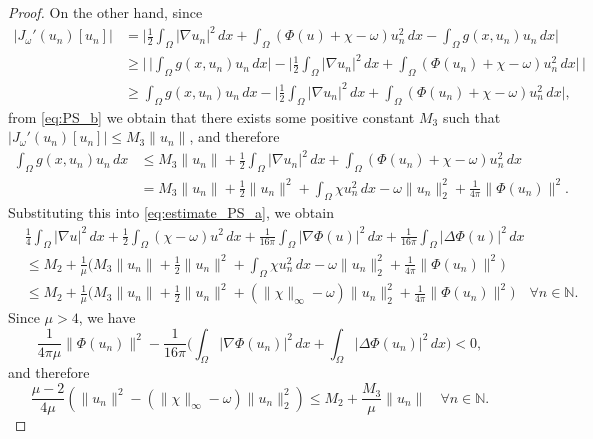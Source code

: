 \documentclass[reqno]{amsart}
\begin{document}
\begin{proof}
On the other hand, since
 \begin{align*}
 |J_\omega'(u_n)[u_n]|
& = \Big|\frac{1}{2} \int_\Omega |\nabla u_n|^2 \,dx 
  + \int_\Omega (\Phi(u) + \chi - \omega) u_n^2 \,dx 
  - \int_\Omega g(x, u_n) u_n \,dx\Big|  \\
& \geq \Big|\, \Big|\int_\Omega g(x, u_n) u_n \,dx\Big| 
  - \Big|\frac{1}{2} \int_\Omega |\nabla u_n|^2 \,dx 
   + \int_\Omega (\Phi(u_n) + \chi - \omega) u_n^2 \,dx\Big|\, \Big|  \\
& \geq \int_\Omega g(x, u_n) u_n \,dx 
 - \Big|\frac{1}{2} \int_\Omega |\nabla u_n|^2 \,dx 
 + \int_\Omega (\Phi(u_n) + \chi - \omega) u_n^2 \,dx\Big|,
\end{align*}
from \eqref{eq:PS_b} we obtain that there exists some positive constant $M_3$ such 
that $|J_\omega'(u_n)[u_n]| \leq M_3 \|u_n\|$, and therefore
\begin{align*}
 \int_\Omega g(x, u_n) u_n \,dx
 & \leq M_3 \|u_n\| + \frac{1}{2} \int_\Omega |\nabla u_n|^2 \,dx 
  + \int_\Omega (\Phi(u_n) + \chi - \omega) u_n^2 \,dx  \\
 & = M_3 \|u_n\| + \frac{1}{2} \|u_n\|^2 + \int_\Omega \chi u_n^2 \,dx 
  - \omega \|u_n\|_2^2 + \frac{1}{4\pi} \|\Phi(u_n)\|^2.
\end{align*}
Substituting this into \eqref{eq:estimate_PS_a}, we obtain
 \begin{align*}
&\frac{1}{4} \int_\Omega |\nabla u|^2 \,dx
  + \frac{1}{2} \int_\Omega (\chi - \omega) u^2 \,dx 
  + \frac{1}{16 \pi} \int_\Omega |\nabla \Phi(u)|^2 \,dx 
  + \frac{1}{16 \pi} \int_\Omega |\Delta \Phi(u)|^2 \,dx  \\
& \leq M_2 + \frac{1}{\mu}\Big(M_3 \|u_n\| + \frac{1}{2} \|u_n\|^2 
 + \int_\Omega \chi u_n^2 \,dx - \omega \|u_n\|_2^2 
 + \frac{1}{4\pi} \|\Phi(u_n)\|^2 \Big)  \\
& \leq M_2 + \frac{1}{\mu}\Big(M_3 \|u_n\| + \frac{1}{2} \|u_n\|^2 
 + (\|\chi\|_\infty - \omega) \|u_n\|_2^2 + \frac{1}{4\pi} \|\Phi(u_n)\|^2 \Big) 
 \quad \forall n \in \mathbb N.
 \end{align*}
Since $\mu > 4$, we have
 \[
 \frac{1}{4\pi \mu} \|\Phi(u_n)\|^2 
 - \frac{1}{16\pi} \Big(\int_\Omega |\nabla \Phi(u_n)|^2 \,dx 
 + \int_\Omega |\Delta \Phi(u_n)|^2 \,dx \Big) < 0,
 \]
and therefore
\begin{equation}
 \label{eq:estimate_PS_b}
 \frac{\mu - 2}{4\mu} (\|u_n\|^2 - (\|\chi\|_\infty 
 - \omega)\|u_n\|_2^2) \leq M_2 + \frac{M_3}{\mu} \|u_n\| 
 \quad \forall n \in \mathbb N.
\end{equation}


\end{proof}
\end{document}
